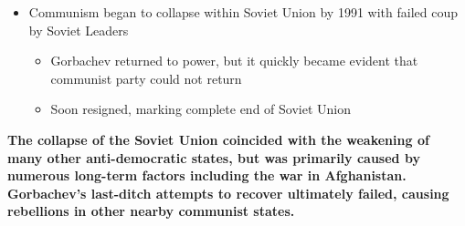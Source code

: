 \documentclass[a4paper]{article}
\begin{document}
{\begin{itemize}
\begin{itemize}
                \item Government of South Africa began to withdraw from formally strict apartheid policies
                \begin{itemize}
                    \item Legalized major black party, released Nelson Mandela -> Nelson Mandela quickly became first black president of South Africa
                \end{itemize}
            \end{itemize}
            \item Communism began to collapse within Soviet Union by 1991 with failed coup by Soviet Leaders
            \begin{itemize}
                \item Gorbachev returned to power, but it quickly became evident that communist party could not return
                \item Soon resigned, marking complete end of Soviet Union
            \end{itemize}
        \end{itemize}
        \textbf{The collapse of the Soviet Union coincided with the weakening of many other anti-democratic states, but was primarily caused by numerous long-term factors including the war in Afghanistan. Gorbachev's last-ditch attempts to recover ultimately failed, causing rebellions in other nearby communist states.}
    }
\end{document}
